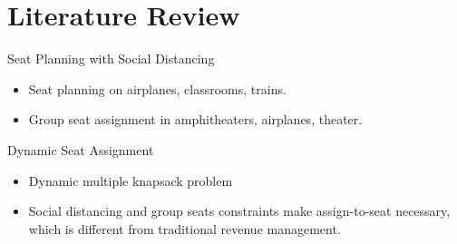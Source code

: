
\section{Literature Review}
    \frame{\sectionpage}

    \begin{frame}{Seat Planning with Social Distancing}
      \begin{itemize}
        \item Seat planning on airplanes, classrooms, trains.
        \vspace*{2cm}
        \item Group seat assignment in amphitheaters, airplanes, theater.
      \end{itemize}
      \end{frame}
      
      \begin{frame}{Dynamic Seat Assignment}
        \begin{itemize}
          \item Dynamic multiple knapsack problem
          \vspace*{2cm}
          \item Social distancing and group seats constraints make assign-to-seat necessary, which is different from traditional revenue management.
        \end{itemize}
      \end{frame}